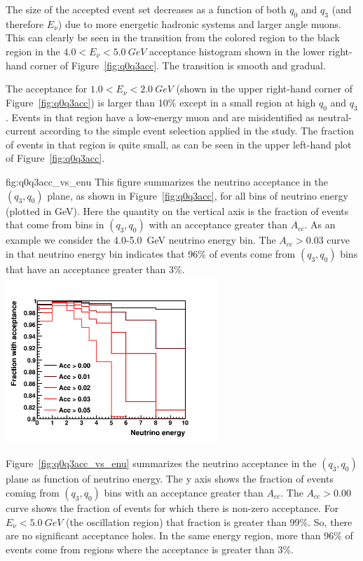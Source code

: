 The size of the accepted event set decreases as a function of both $q_0$ and $q_3$ (and therefore $E_\nu$) due to more energetic hadronic systems and larger angle muons. This can clearly be seen in the transition from the colored region to the black region in the $\num{4.0} < E_\nu < \SI{5.0}{GeV}$ acceptance histogram shown in the lower right-hand corner of Figure~\ref{fig:q0q3acc}. The transition is smooth and gradual. %

The acceptance for $\num{1.0} < E_\nu < \SI{2.0}{GeV}$ (shown in the upper right-hand corner of Figure~\ref{fig:q0q3acc}) is larger than 10\% except in a small region at high $q_0$ and $q_3$. Events in that region have a low-energy muon and are misidentified as neutral-current according to the simple event selection applied in the study. The fraction of events in that region is quite small, as can be seen in the upper left-hand plot of Figure~\ref{fig:q0q3acc}. 

\begin{dunefigure}{fig:q0q3acc_vs_enu}
{This figure summarizes the neutrino acceptance in the $(q_3,q_0)$ plane, as shown in Figure~\ref{fig:q0q3acc}, for all bins of neutrino energy (plotted in GeV). Here the quantity on the vertical axis is the fraction of events that come from bins in $(q_3,q_0)$ with an acceptance greater than $A_{cc}$. As an example we consider the \num{4.0}-\SI{5.0}{GeV} neutrino energy bin. The $A_{cc}>0.03$ curve in that neutrino energy bin indicates that 96\% of events come from $(q_3,q_0)$ bins that have an acceptance greater than 3\%. }
      \includegraphics[width=0.6\textwidth]{graphics/frac_with_acc.png}
\end{dunefigure}

Figure~\ref{fig:q0q3acc_vs_enu} summarizes the neutrino acceptance in the $(q_3,q_0)$ plane as function of neutrino energy. The y axis shows the fraction of events coming from $(q_3,q_0)$ bins with an acceptance greater than $A_{cc}$. The $A_{cc}>0.00$ curve shows the fraction of events for which there is non-zero acceptance. For $E_\nu < \SI{5.0}{GeV}$ (the oscillation region) that fraction is greater than 99\%. So, there are no significant acceptance holes.  In the same energy region, more than 96\% of events come from regions where the acceptance is greater than 3\%. %

